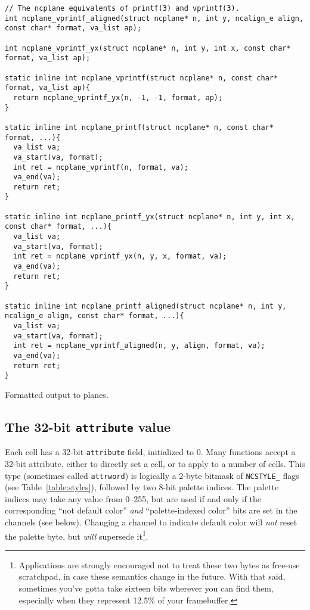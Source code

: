 \begin{listing}[!htb]
\begin{verbatim}
// The ncplane equivalents of printf(3) and vprintf(3).
int ncplane_vprintf_aligned(struct ncplane* n, int y, ncalign_e align, const char* format, va_list ap);

int ncplane_vprintf_yx(struct ncplane* n, int y, int x, const char* format, va_list ap);

static inline int ncplane_vprintf(struct ncplane* n, const char* format, va_list ap){
  return ncplane_vprintf_yx(n, -1, -1, format, ap);
}

static inline int ncplane_printf(struct ncplane* n, const char* format, ...){
  va_list va;
  va_start(va, format);
  int ret = ncplane_vprintf(n, format, va);
  va_end(va);
  return ret;
}

static inline int ncplane_printf_yx(struct ncplane* n, int y, int x, const char* format, ...){
  va_list va;
  va_start(va, format);
  int ret = ncplane_vprintf_yx(n, y, x, format, va);
  va_end(va);
  return ret;
}

static inline int ncplane_printf_aligned(struct ncplane* n, int y, ncalign_e align, const char* format, ...){
  va_list va;
  va_start(va, format);
  int ret = ncplane_vprintf_aligned(n, y, align, format, va);
  va_end(va);
  return ret;
}
\end{verbatim}
\caption{Formatted output to planes.}
\label{list:printf}
\end{listing}

\subsection{The 32-bit \texttt{attribute} value}
\label{sec:attribute}
Each cell has a 32-bit \texttt{attribute} field, initialized to 0. Many functions
accept a 32-bit attribute, either to directly set a cell, or to apply to a number
of cells. This type (sometimes called \texttt{attrword}) is logically a 2-byte
bitmask of \texttt{NCSTYLE\_} flags (see Table~\ref{table:styles}), followed by two 8-bit palette indices. The
palette indices may take any value from 0--255, but are used if and only if the
corresponding ``not default color'' \textit{and} ``palette-indexed color'' bits
are set in the channels (see below). Changing a channel to indicate default color
will \textit{not} reset the palette byte, but \textit{will} supersede
it\footnote{Applications are strongly encouraged not to treat these two bytes as free-use scratchpad, in
case these semantics change in the future. With that said, sometimes you've gotta
take sixteen bits wherever you can find them, especially when they represent 12.5\%
of your framebuffer.}.

